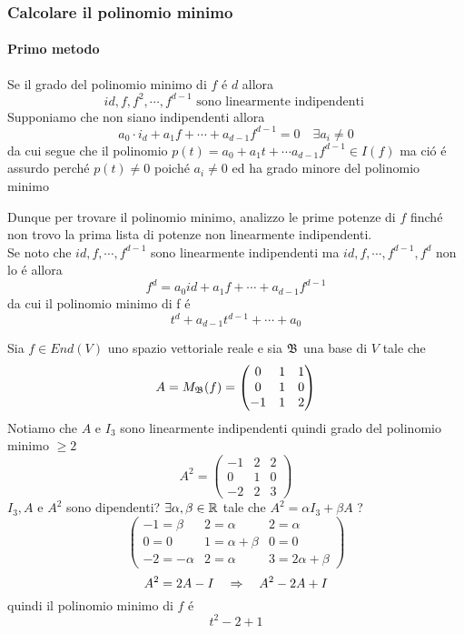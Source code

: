 \subsubsection{Calcolare il polinomio minimo}
\paragraph{ Primo metodo}
\begin{oss} Se il grado del polinomio minimo di $f$ \'e $d$ allora
$$ id, f,f^2 ,\cdots , f^{d-1} \text{ sono linearmente indipendenti } $$
Supponiamo che non siano indipendenti allora
$$ a_0 \cdot i_d +a_1 f + \cdots  + a_{d-1} f^{d-1} =0 \quad \exists a_i \neq 0$$
da cui segue che il polinomio $p(t)=a_0 + a_1 t + \cdots a_{d-1}f^{d-1} \in I(f) $ ma ci\'o \'e assurdo perch\'e $p(t) \neq 0 $ poich\'e $a_i \neq 0 $ ed ha grado minore del polinomio minimo
\end{oss}
Dunque per trovare il polinomio minimo, analizzo le prime potenze di $f$ finch\'e non trovo la prima lista di potenze non linearmente indipendenti.\\
Se noto che $ id, f, \cdots, f^{d-1} $ sono linearmente indipendenti ma $ id, f, \cdots, f^{d-1} ,f^d $ non lo \'e allora
$$ f^d= a_0 id + a_1 f + \cdots + a_{d-1} f^{d-1} $$
da cui il polinomio minimo di f \'e 
$$ t^d + a_{d-1} t^{d-1} + \cdots + a_0 $$
\begin{ex}
\end{ex}Sia $f \in End(V) $ uno spazio vettoriale reale e sia $\mathfrak{B}$ una base di $V$ tale che 
$$A= M_{\mathfrak{B}}(f) = \begin{pmatrix} 0  & 1 & 1 \\
											0  & 1 & 0 \\
											-1 & 1 & 2  \end{pmatrix}$$
Notiamo che $A $ e $I_3$ sono linearmente indipendenti quindi grado del polinomio minimo $\geq 2 $
$$ A^2 = \begin{pmatrix} -1 & 2 & 2 \\
										0 & 1 & 0 \\
										-2 & 2 & 3  \end{pmatrix} $$
$I_3,A $ e $A^2 $ sono dipendenti? $\exists \alpha, \beta \in \mathbb{R} $ tale che $A^2 =\alpha I_3 + \beta A $ ? 
$$ \begin{pmatrix}
-1=\beta & 2 = \alpha & 2 =\alpha \\
0=0		& 	 1= \alpha+\beta & 0=0 \\
-2=-\alpha & 2=\alpha & 3 =2\alpha + \beta 
\end{pmatrix}$$
$$ A^2 = 2 A - I \quad \Rightarrow \quad A^2 -2A +I $$
quindi il polinomio minimo di $f$ \'e 
$$ t^2 -2+1 $$
